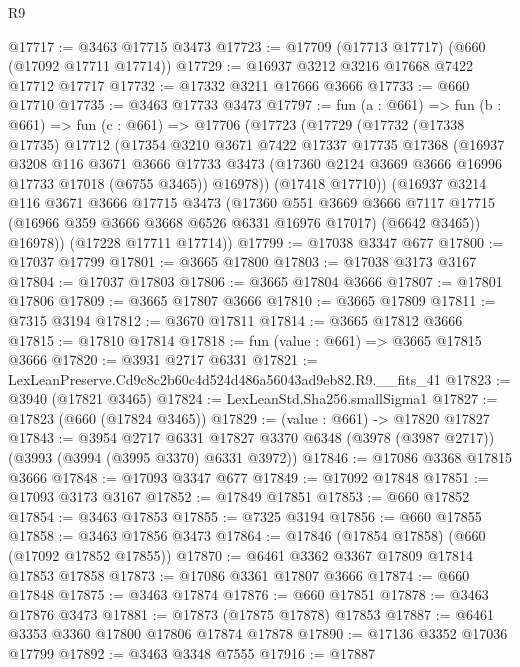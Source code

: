 \begin{lexlean}{R9}
\begin{coremodule}
@17717 := @3463 @17715 @3473
@17723 := @17709 (@17713 @17717) (@660 (@17092 @17711 @17714))
@17729 := @16937 @3212 @3216 @17668 @7422 @17712 @17717
@17732 := @17332 @3211 @17666 @3666
@17733 := @660 @17710
@17735 := @3463 @17733 @3473
@17797 := fun (a : @661) =>
  fun (b : @661) =>
  fun (c : @661) =>
  @17706
    (@17723
      (@17729
        (@17732
          (@17338 @17735)
          @17712
          (@17354
            @3210
            @3671
            @7422
            @17337
            @17735
            @17368
            (@16937
              @3208
              @116
              @3671
              @3666
              @17733
              @3473
              (@17360 @2124 @3669 @3666 @16996 @17733 @17018 (@6755 @3465))
              @16978))
          (@17418 @17710))
        (@16937
          @3214
          @116
          @3671
          @3666
          @17715
          @3473
          (@17360
            @551
            @3669
            @3666
            @7117
            @17715
            (@16966 @359 @3666 @3668 @6526 @6331 @16976 @17017)
            (@6642 @3465))
          @16978))
      (@17228 @17711 @17714))
@17799 := @17038 @3347 @677
@17800 := @17037 @17799
@17801 := @3665 @17800
@17803 := @17038 @3173 @3167
@17804 := @17037 @17803
@17806 := @3665 @17804 @3666
@17807 := @17801 @17806
@17809 := @3665 @17807 @3666
@17810 := @3665 @17809
@17811 := @7315 @3194
@17812 := @3670 @17811
@17814 := @3665 @17812 @3666
@17815 := @17810 @17814
@17818 := fun (value : @661) => @3665 @17815 @3666
@17820 := @3931 @2717 @6331
@17821 := LexLeanPreserve.Cd9c8c2b60c4d524d486a56043ad9eb82.R9.__fits_41
@17823 := @3940 (@17821 @3465)
@17824 := LexLeanStd.Sha256.smallSigma1
@17827 := @17823 (@660 (@17824 @3465))
@17829 := (value : @661) -> @17820 @17827
@17843 := @3954
    @2717
    @6331
    @17827
    @3370
    @6348
    (@3978 (@3987 @2717))
    (@3993 (@3994 (@3995 @3370) @6331 @3972))
@17846 := @17086 @3368 @17815 @3666
@17848 := @17093 @3347 @677
@17849 := @17092 @17848
@17851 := @17093 @3173 @3167
@17852 := @17849 @17851
@17853 := @660 @17852
@17854 := @3463 @17853
@17855 := @7325 @3194
@17856 := @660 @17855
@17858 := @3463 @17856 @3473
@17864 := @17846 (@17854 @17858) (@660 (@17092 @17852 @17855))
@17870 := @6461 @3362 @3367 @17809 @17814 @17853 @17858
@17873 := @17086 @3361 @17807 @3666
@17874 := @660 @17848
@17875 := @3463 @17874
@17876 := @660 @17851
@17878 := @3463 @17876 @3473
@17881 := @17873 (@17875 @17878) @17853
@17887 := @6461 @3353 @3360 @17800 @17806 @17874 @17878
@17890 := @17136 @3352 @17036 @17799
@17892 := @3463 @3348 @7555
@17916 := @17887

\end{coremodule}
\end{lexlean}
